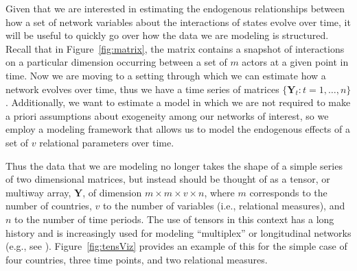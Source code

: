 \documentclass[3p,times,twocolumn,authoryear,12pt]{elsarticle}
\newcommand{\bl}[1]{{\mathbf #1}}
\begin{document}
Given that we are interested in estimating the endogenous relationships between how a set of network variables about the interactions of states evolve over time, it will be useful to quickly go over how the data we are modeling is structured. Recall that in Figure~\ref{fig:matrix}, the matrix contains a snapshot of interactions on a particular dimension occurring between a set of $m$ actors at a given point in time. Now we are moving to a setting through which we can estimate how a network evolves over time, thus we have a time series of matrices $\{{\bl Y}_t : t = 1, \ldots, n\}$. Additionally, we want to estimate a model in which we are not required to make a priori assumptions about exogeneity among our networks of interest, so we employ a modeling framework that allows us to model the endogenous effects of a set of $v$ relational parameters over time. 

Thus the data that we are modeling no longer takes the shape of a simple series of two dimensional matrices, but instead should be thought of as a tensor, or multiway array, $\bl Y$, of dimension $m \times m \times v \times n$, where $m$ corresponds to the number of countries, $v$ to the number of variables (i.e., relational measures), and $n$ to the number of time periods. The use of tensors in this context has a long history and is increasingly used for modeling ``multiplex'' or longitudinal networks (e.g., see \citealp{mucha:etal:2010, dunlavy:etal:2011}). Figure~\ref{fig:tensViz} provides an example of this for the simple case of four countries, three time points, and two relational measures. 
\end{document}
